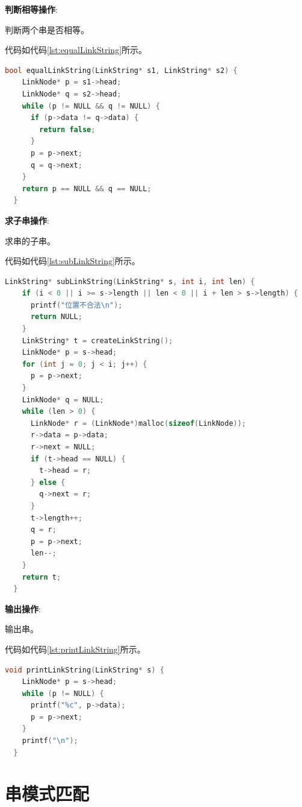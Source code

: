\documentclass[lang=cn,newtx,10pt,scheme=chinese]{../elegantbook}
\begin{document}
\textbf{判断相等操作}:

判断两个串是否相等。

代码如代码\ref{lst:equalLinkString}所示。

\begin{lstlisting}[language=C++, caption={判断两个串是否相等示例代码}, label={lst:equalLinkString}]
  bool equalLinkString(LinkString* s1, LinkString* s2) {
    LinkNode* p = s1->head;
    LinkNode* q = s2->head;
    while (p != NULL && q != NULL) {
      if (p->data != q->data) {
        return false;
      }
      p = p->next;
      q = q->next;
    }
    return p == NULL && q == NULL;
  }

\end{lstlisting}

\textbf{求子串操作}:

求串的子串。

代码如代码\ref{lst:subLinkString}所示。

\begin{lstlisting}[language=C++, caption={求串的子串示例代码}, label={lst:subLinkString}]
  LinkString* subLinkString(LinkString* s, int i, int len) {
    if (i < 0 || i >= s->length || len < 0 || i + len > s->length) {
      printf("位置不合法\n");
      return NULL;
    }
    LinkString* t = createLinkString();
    LinkNode* p = s->head;
    for (int j = 0; j < i; j++) {
      p = p->next;
    }
    LinkNode* q = NULL;
    while (len > 0) {
      LinkNode* r = (LinkNode*)malloc(sizeof(LinkNode));
      r->data = p->data;
      r->next = NULL;
      if (t->head == NULL) {
        t->head = r;
      } else {
        q->next = r;
      }
      t->length++;
      q = r;
      p = p->next;
      len--;
    }
    return t;
  }

\end{lstlisting}

\textbf{输出操作}:

输出串。

代码如代码\ref{lst:printLinkString}所示。

\begin{lstlisting}[language=C++, caption={输出串示例代码}, label={lst:printLinkString}]
  void printLinkString(LinkString* s) {
    LinkNode* p = s->head;
    while (p != NULL) {
      printf("%c", p->data);
      p = p->next;
    }
    printf("\n");
  }

\end{lstlisting}


\section{串模式匹配}
\end{document}
